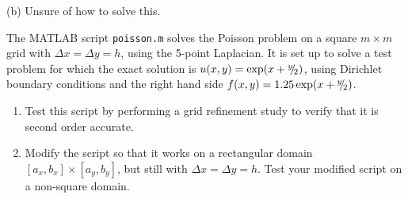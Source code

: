 \documentclass[11pt,twoside,openany]{memoir}
\begin{document}
\begin{solution}
\begin{center}
{}
\end{center}

(b) Unsure of how to solve this.
\end{solution}
\newpage
\begin{exercise}[manual-num={3.1}]
The MATLAB script \texttt{poisson.m} solves the Poisson problem on a square $m \times m$ grid with $\Delta x = \Delta y = h$, using the 5-point Laplacian. It is set up to solve a test problem for which the exact solution is $u(x,y) = \operatorname{exp}(x + {}^{y}\mskip -5mu/\mskip -3mu_{2})$, using Dirichlet boundary conditions and the right hand side $f(x,y) = 1.25\operatorname{exp}(x+{}^{y}\mskip -5mu/\mskip -3mu_{2})$.
    \begin{enumerate}[label = (\alph*),itemsep=1pt,topsep=3pt]
        \item Test this script by performing a grid refinement study to verify that it is second order accurate.
        \item Modify the script so that it works on a rectangular domain $[a_x,b_x] \times [a_y,b_y]$, but still with $\Delta x = \Delta y = h$. Test your modified script on a non-square domain.
    \end{enumerate}
\end{exercise}
\end{document}
